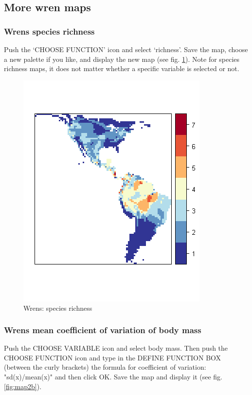 \documentclass[ a4paper ]{article}
\begin{document}
	
	\subsection{ More wren maps}
		\subsubsection{Wrens species richness}
Push the `CHOOSE FUNCTION' icon and select `richness'. Save the map, choose a new palette if you like, and display the new map (see fig. \ref{fig:map2c}). Note for species richness maps, it does not matter whether a specific variable is selected or not.
	
	\begin{figure}[htbp]
  \begin{center}
	\includegraphics[width=0.5\linewidth]{map2c}
    \caption{\label{fig:map2c} Wrens: species richness}
  \end{center}
\end{figure}	
	
	
	\subsubsection{Wrens mean coefficient of variation  of body mass}
	\label{sec:wrensCV}

	Push the CHOOSE VARIABLE icon and select body mass. Then push the CHOOSE FUNCTION icon and type in the DEFINE FUNCTION BOX (between the curly brackets) the formula for coefficient of variation: "sd(x)/mean(x)" and then click OK. Save the map and display it (see fig. \ref{fig:map2b}).
	
\end{document}
